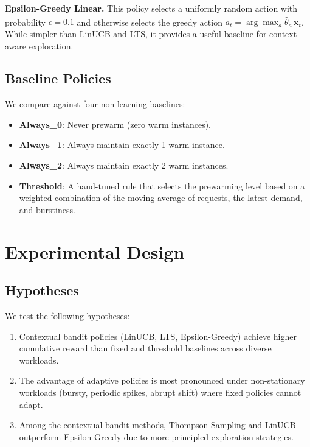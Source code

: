 \documentclass[11pt]{article}
\begin{document}
\textbf{Epsilon-Greedy Linear.} This policy selects a uniformly random action with probability $\epsilon = 0.1$ and otherwise selects the greedy action $a_t = \arg\max_a \hat{\theta}_a^\top \mathbf{x}_t$. While simpler than LinUCB and LTS, it provides a useful baseline for context-aware exploration.

\subsection{Baseline Policies}

We compare against four non-learning baselines:
\begin{itemize}[nosep]
    \item \textbf{Always\_0}: Never prewarm (zero warm instances).
    \item \textbf{Always\_1}: Always maintain exactly 1 warm instance.
    \item \textbf{Always\_2}: Always maintain exactly 2 warm instances.
    \item \textbf{Threshold}: A hand-tuned rule that selects the prewarming level based on a weighted combination of the moving average of requests, the latest demand, and burstiness.
\end{itemize}

\section{Experimental Design}

\subsection{Hypotheses}

We test the following hypotheses:
\begin{enumerate}[nosep]
    \item[\textbf{H1:}] Contextual bandit policies (LinUCB, LTS, Epsilon-Greedy) achieve higher cumulative reward than fixed and threshold baselines across diverse workloads.
    \item[\textbf{H2:}] The advantage of adaptive policies is most pronounced under non-stationary workloads (bursty, periodic spikes, abrupt shift) where fixed policies cannot adapt.
    \item[\textbf{H3:}] Among the contextual bandit methods, Thompson Sampling and LinUCB outperform Epsilon-Greedy due to more principled exploration strategies.
\end{enumerate}
\end{document}

